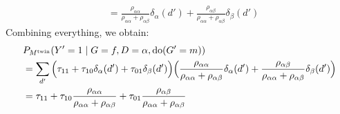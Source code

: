 \begin{enumerate}[resume*]
{\begin{equation*}
\begin{split}
        & = \frac{\rho_{\alpha\alpha}}{\rho_{\alpha\alpha}+\rho_{\alpha\beta}} \delta_{\alpha}(d') + \frac{\rho_{\alpha\beta}}{\rho_{\alpha\alpha}+\rho_{\alpha\beta}} \delta_{\beta}(d')
      \end{split}\end{equation*}
      Combining everything, we obtain:
      \begin{equation*}\begin{split}
        &P_{M^{\mathrm{twin}}}(Y'=1 \mid G=f,D=\alpha,\operatorname{do}(G'=m)) \\
        &= \sum_{d'} 
          \Big( \tau_{11} + \tau_{10} \delta_\alpha(d') + \tau_{01} \delta_\beta(d') \Big)
          \Big( \frac{\rho_{\alpha\alpha}}{\rho_{\alpha\alpha}+\rho_{\alpha\beta}} \delta_{\alpha}(d') + \frac{\rho_{\alpha\beta}}{\rho_{\alpha\alpha}+\rho_{\alpha\beta}} \delta_{\beta}(d') \Big) \\
        &= \tau_{11} + \tau_{10} \frac{\rho_{\alpha\alpha}}{\rho_{\alpha\alpha} + \rho_{\alpha\beta}} + \tau_{01} \frac{\rho_{\alpha\beta}}{\rho_{\alpha\alpha} + \rho_{\alpha\beta}}
      \end{split}\end{equation*}
}
\end{enumerate}
